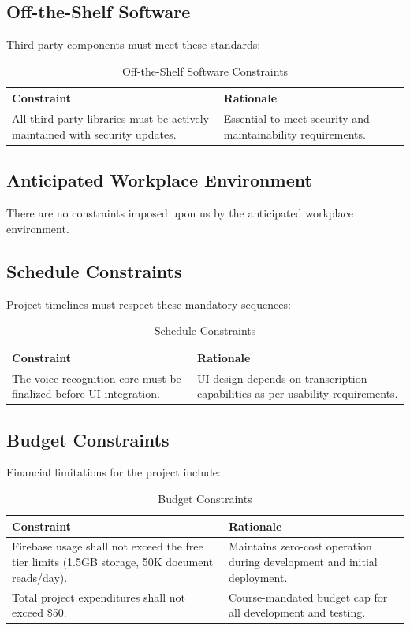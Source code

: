 \documentclass[12pt]{article}
\begin{document}
\subsection{Off-the-Shelf Software}
Third-party components must meet these standards:

\begin{table}[H]
\centering
\begin{tabular}{|p{6cm}|p{6cm}|}
\hline
\textbf{Constraint} & \textbf{Rationale} \\
\hline
All third-party libraries must be actively maintained with security updates. & Essential to meet security and maintainability requirements. \\
\hline
\end{tabular}
\caption{Off-the-Shelf Software Constraints}
\label{tab:off_the_shelf_constraints}
\end{table}

\subsection{Anticipated Workplace Environment}
There are no constraints imposed upon us by the anticipated workplace environment.

\subsection{Schedule Constraints}
Project timelines must respect these mandatory sequences:

\begin{table}[H]
\centering
\begin{tabular}{|p{6cm}|p{6cm}|}
\hline
\textbf{Constraint} & \textbf{Rationale} \\
\hline
The voice recognition core must be finalized before UI integration. & UI design depends on transcription capabilities as per usability requirements. \\
\hline
\end{tabular}
\caption{Schedule Constraints}
\label{tab:schedule_constraints}
\end{table}

\subsection{Budget Constraints}
Financial limitations for the project include:

\begin{table}[H]
\centering
\begin{tabular}{|p{6cm}|p{6cm}|}
\hline
\textbf{Constraint} & \textbf{Rationale} \\
\hline
Firebase usage shall not exceed the free tier limits (1.5GB storage, 50K document reads/day). & Maintains zero-cost operation during development and initial deployment. \\ 
\hline
Total project expenditures shall not exceed \$50. & Course-mandated budget cap for all development and testing. \\
\hline
\end{tabular}
\caption{Budget Constraints}
\label{tab:budget_constraints}
\end{table}
\end{document}
